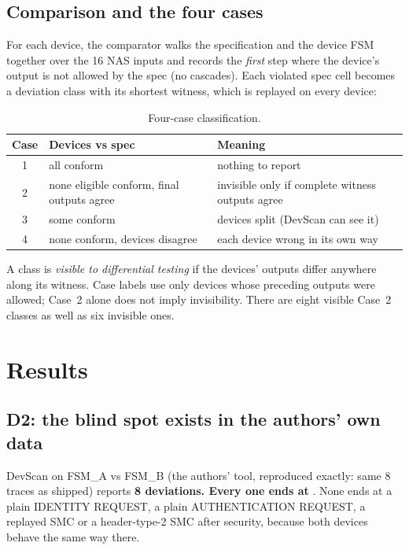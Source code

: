 \documentclass[11pt,a4paper]{article}
\newcommand{\sym}[1]{\texttt{\detokenize{#1}}}
\begin{document}
\subsection{Comparison and the four cases}

For each device, the comparator walks the specification and the device FSM together over the 16 NAS inputs
and records the \emph{first} step where the device's output is not allowed by the spec (no cascades). Each
violated spec cell becomes a deviation class with its shortest witness, which is replayed on every device:

\begin{table}[H]
\centering
\small
\begin{tabular}{c l l}
\toprule
Case & Devices vs spec & Meaning \\
\midrule
1 & all conform & nothing to report \\
2 & none eligible conform, final outputs agree & invisible only if complete witness outputs agree \\
3 & some conform & devices split (DevScan can see it) \\
4 & none conform, devices disagree & each device wrong in its own way \\
\bottomrule
\end{tabular}
\caption{Four-case classification.}
\end{table}

A class is \emph{visible to differential testing} if the devices' outputs differ anywhere along its witness.
Case labels use only devices whose preceding outputs were allowed; Case~2 alone does not imply invisibility.
There are eight visible Case~2 classes as well as six invisible ones.

\section{Results}

\subsection{D2: the blind spot exists in the authors' own data}

DevScan on FSM\_A vs FSM\_B (the authors' tool, reproduced exactly: same 8 traces as shipped) reports
\textbf{8 deviations. Every one ends at} \sym{nas_sm_cmd_ns}. None ends at a plain IDENTITY REQUEST, a plain
AUTHENTICATION REQUEST, a replayed SMC or a header-type-2 SMC after security, because both devices behave
the same way there.
\end{document}
